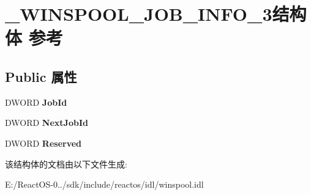 \hypertarget{struct___w_i_n_s_p_o_o_l___j_o_b___i_n_f_o__3}{}\section{\+\_\+\+W\+I\+N\+S\+P\+O\+O\+L\+\_\+\+J\+O\+B\+\_\+\+I\+N\+F\+O\+\_\+3结构体 参考}
\label{struct___w_i_n_s_p_o_o_l___j_o_b___i_n_f_o__3}
\subsection*{Public 属性}
\begin{DoxyCompactItemize}
\item 
\mbox{\label{struct___w_i_n_s_p_o_o_l___j_o_b___i_n_f_o__3_a238ef7cf9592ddb9d79338d4e92df8dd}} 
D\+W\+O\+RD {\bfseries Job\+Id}
\item 
\mbox{\label{struct___w_i_n_s_p_o_o_l___j_o_b___i_n_f_o__3_a984fe5d23a82236bed73c09828ffb67c}} 
D\+W\+O\+RD {\bfseries Next\+Job\+Id}
\item 
\mbox{\label{struct___w_i_n_s_p_o_o_l___j_o_b___i_n_f_o__3_a7c8bde7a967d4068c26551a7af30f412}} 
D\+W\+O\+RD {\bfseries Reserved}
\end{DoxyCompactItemize}


该结构体的文档由以下文件生成\+:\begin{DoxyCompactItemize}
\item 
E\+:/\+React\+O\+S-\/0../sdk/include/reactos/idl/winspool.\+idl\end{DoxyCompactItemize}
